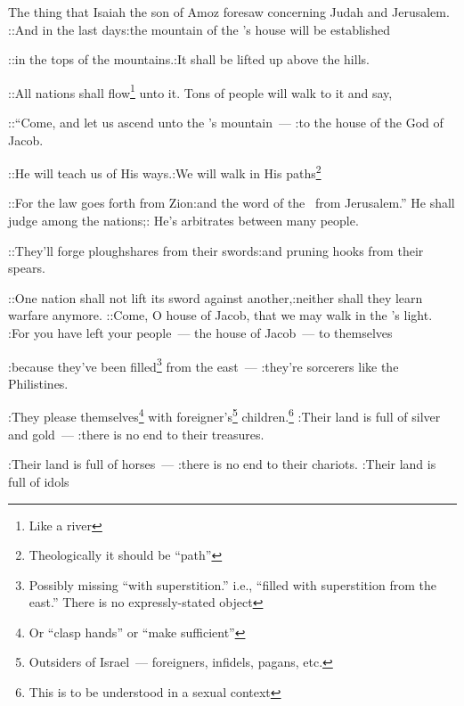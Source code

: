 
\begin{inparaenum}
   The thing that Isaiah the son of Amoz foresaw concerning Judah and Jerusalem.%
   ::And in the last days:the mountain of the \lord's house will be established%
  
  ::in the tops of the mountains.:It shall be lifted up above the hills.%
  
  ::All nations shall flow\footnote{Like a river} unto it. Tons of people will walk to it and say,%
  
  ::``Come, and let us ascend unto the \lord's mountain~--- :to the house of the God of Jacob.%
  
  ::He will teach us of His ways.:We will walk in His paths\footnote{Theologically it should be ``path''}%
  
  ::For the law goes forth from Zion:and the word of the \lord\ from Jerusalem.''%
   He shall judge among the nations;: He's arbitrates between many people.%
  
  ::They'll forge ploughshares from their swords:and pruning hooks from their spears.%
  
  ::One nation shall not lift its sword against another,:neither shall they learn warfare anymore.%
   ::Come, O house of Jacob, that we may walk in the \lord's light.%
   :For you have left your people~--- the house of Jacob~--- to themselves%
  
  :because they've been filled\footnote{Possibly missing ``with superstition.'' i.e., ``filled with superstition from the east.'' There is no expressly-stated object} from the east~--- :they're sorcerers like the Philistines.%
  
  :They please themselves\footnote{Or ``clasp hands'' or ``make sufficient''} with foreigner's\footnote{Outsiders of Israel~--- foreigners, infidels, pagans, etc.} children.\footnote{This is to be understood in a sexual context}%
   :Their land is full of silver and gold~--- :there is no end to their treasures.%
  
  :Their land is full of horses~--- :there is no end to their chariots.%
   :Their land is full of idols%
  

\end{inparaenum}
